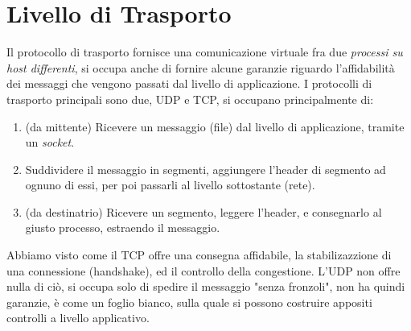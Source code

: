 \documentclass[12pt, letterpaper]{article}
\begin{document}
\section{Livello di Trasporto}
Il protocollo di trasporto fornisce una comunicazione virtuale fra due \textit{processi su host 
differenti}, si occupa anche di fornire alcune garanzie riguardo l'affidabilità dei messaggi che vengono 
passati dal livello di applicazione. I protocolli di trasporto principali sono due, UDP e TCP, si occupano 
principalmente di:\begin{enumerate}
    \item (da mittente) Ricevere un messaggio (file) dal livello di applicazione, tramite un \textit{socket}. 
    \item Suddividere il messaggio in segmenti, aggiungere l'header di segmento ad ognuno di essi, per 
    poi passarli al livello sottostante (rete).
    \item (da destinatrio) Ricevere un segmento, leggere l'header, e consegnarlo al giusto processo, 
    estraendo il messaggio.
\end{enumerate}
Abbiamo visto come il TCP offre una consegna affidabile, la stabilizazzione di una connessione (handshake), 
ed il controllo della congestione. L'UDP non offre nulla di ciò, si occupa solo di spedire il messaggio 
"senza fronzoli", non ha quindi garanzie, è come un foglio bianco, sulla quale si possono costruire appositi 
controlli a livello applicativo.
\end{document}
